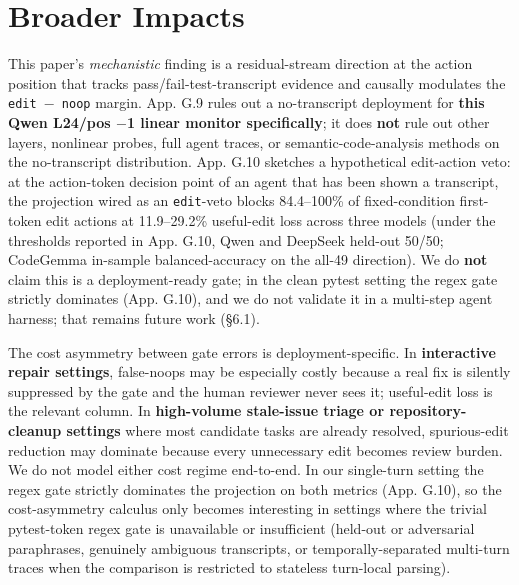 \documentclass[
  11pt,
  a4paper]{article}
\begin{document}
\section{Broader Impacts}\label{broader-impacts}

This paper's \emph{mechanistic} finding is a residual-stream direction
at the action position that tracks pass/fail-test-transcript evidence
and causally modulates the \texttt{edit\ \ensuremath{-}\ noop} margin. App. G.9 rules
out a no-transcript deployment for \textbf{this Qwen L24/pos \ensuremath{-}1 linear
monitor specifically}; it does \textbf{not} rule out other layers,
nonlinear probes, full agent traces, or semantic-code-analysis methods
on the no-transcript distribution. App. G.10 sketches a hypothetical
edit-action veto: at the action-token decision point of an agent that
has been shown a transcript, the projection wired as an
\texttt{edit}-veto blocks 84.4--100\% of fixed-condition first-token
edit actions at 11.9--29.2\% useful-edit loss across three models (under
the thresholds reported in App. G.10, Qwen and DeepSeek held-out 50/50;
CodeGemma in-sample balanced-accuracy on the all-49 direction). We do
\textbf{not} claim this is a deployment-ready gate; in the clean pytest
setting the regex gate strictly dominates (App. G.10), and we do not
validate it in a multi-step agent harness; that remains future work
(\S{}6.1).

The cost asymmetry between gate errors is deployment-specific. In
\textbf{interactive repair settings}, false-noops may be especially
costly because a real fix is silently suppressed by the gate and the
human reviewer never sees it; useful-edit loss is the relevant column.
In \textbf{high-volume stale-issue triage or repository-cleanup
settings} where most candidate tasks are already resolved, spurious-edit
reduction may dominate because every unnecessary edit becomes review
burden. We do not model either cost regime end-to-end. In our
single-turn setting the regex gate strictly dominates the projection on
both metrics (App. G.10), so the cost-asymmetry calculus only becomes
interesting in settings where the trivial pytest-token regex gate is
unavailable or insufficient (held-out or adversarial paraphrases,
genuinely ambiguous transcripts, or temporally-separated multi-turn
traces when the comparison is restricted to stateless turn-local
parsing).
\end{document}
